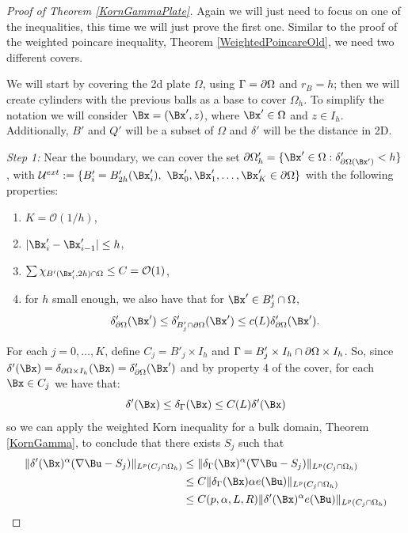 \begin{proof}[Proof of Theorem \ref{KornGammaPlate}]
Again we will just need to focus on one of the inequalities, this time we will just prove the first one. Similar to the proof of the weighted poincare inequality, Theorem \ref{WeightedPoincareOld}, we need two different covers. 

We will start by covering the 2d plate $\Omega$, using $\Gamma=\partial\Omega$ and $r_B = h$; then we will create cylinders with the previous balls as a base to cover $\Omega_h$. To simplify the notation we will consider $\Bx=(\Bx',z)$, where $\Bx'\in \Omega$ and $z\in I_h$. Additionally, $B'$ and $Q'$ will be a subset of $\Omega$ and  $\delta'$ will be the distance in 2D. 

\textit{Step 1:} Near the boundary, we can cover the set $\dOm'_h= \{\Bx'\in\Omega: \delta'_{\dOm(\Bx')}<h\}$, with $\mathcal{U}^{ext}:=\{B'_i=B'_{2h}(\Bx'_i),\  \Bx'_0,\Bx'_1,\ldots,\Bx'_K \in \partial\Omega\}$ with the following properties:
\begin{enumerate}
    \item  $K=\mathcal{O}(1/h)$,
    \item  $|\Bx'_i-\Bx'_{i-1}|\leq h$,
    \item  $\sum \chi_{B'(\Bx'_i,2h)\cap \Omega}\leq C=\mathcal{O}(1)$,
    \item  for $h$ small enough, we also have that for $\Bx'\in B'_j\cap \Omega$, $$\delta'_{\partial\Omega}(\Bx')\leq\delta'_{B'_j\cap \partial\Omega}(\Bx')\leq c(L)\delta'_{\partial\Omega}(\Bx').$$
\end{enumerate}

For each $j=0,\ldots, K$, define $C_j=B'_j\times I_h$ and $\Gamma = B'_j\times I_h \cap \partial\Omega\times I_h$.
So, since $\delta'(\Bx)= \delta_{\dOm\times I_h}(\Bx)=\delta'_{\dOm}(\Bx')$ and by property 4 of the cover, for each $\Bx\in C_j$ we have that:
$$\delta'(\Bx)\leq\delta_\GG(\Bx)\leq C(L)\delta'(\Bx)$$
so we can apply the weighted Korn inequality for a bulk domain, Theorem \ref{KornGamma}, to conclude that there exists $S_j$ such that
\begin{align*}
\|\delta'(\Bx)^\Ga(\nabla \Bu -S_j)\|_{L^p(C_j\cap\Omega_h)}&\leq \|\delta_{\GG}(\Bx)^\Ga(\nabla \Bu -S_j)\|_{L^p(C_j\cap\Omega_h)}\\
&\leq C
\|\delta_\GG(\Bx)\Ga e(\Bu)\|_{L^p(C_j\cap\Omega_h)}
\\
&\leq C(p,\alpha,L,R) \|\delta'(\Bx)^\Ga e(\Bu)\|_{L^p(C_j\cap\Omega_h)}
\end{align*}



\end{proof}
